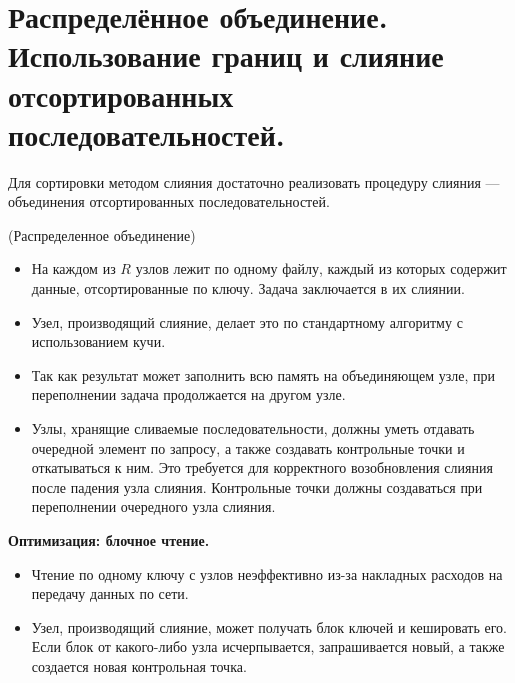 \section{Распределённое объединение. Использование границ и слияние
  отсортированных последовательностей.}

Для сортировки методом слияния достаточно реализовать процедуру слияния ---
объединения отсортированных последовательностей.

\begin{algorithm}(Распределенное объединение)
  \begin{itemize}
    \item На каждом из $R$ узлов лежит по одному файлу, каждый из которых
      содержит данные, отсортированные по ключу. Задача заключается в их
      слиянии.
    \item Узел, производящий слияние, делает это по стандартному алгоритму с
      использованием кучи.
    \item Так как результат может заполнить всю память на объединяющем узле,
      при переполнении задача продолжается на другом узле.
    \item Узлы, хранящие сливаемые последовательности, должны уметь отдавать
      очередной элемент по запросу, а также создавать контрольные точки и
      откатываться к ним. Это требуется для корректного возобновления слияния
      после падения узла слияния. Контрольные точки должны создаваться при
      переполнении очередного узла слияния.
  \end{itemize}
\end{algorithm}

\textbf{Оптимизация: блочное чтение.}
\begin{itemize}
  \item Чтение по одному ключу с узлов неэффективно из-за накладных расходов на
    передачу данных по сети.
  \item Узел, производящий слияние, может получать блок ключей и кешировать его.
    Если блок от какого-либо узла исчерпывается, запрашивается новый, а также
    создается новая контрольная точка.
\end{itemize}


